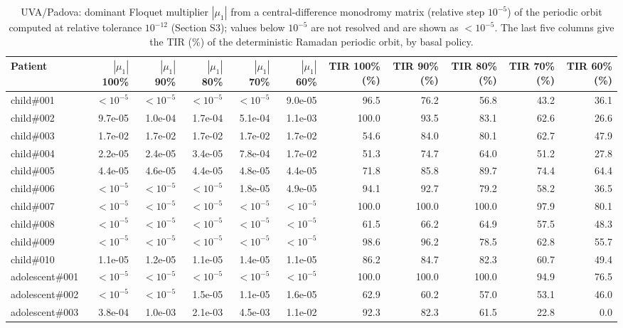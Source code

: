 \begin{table}[H]
\centering
\caption{UVA/Padova: dominant Floquet multiplier $|\mu_1|$ from a central-difference monodromy matrix (relative step $10^{-5}$) of the periodic orbit computed at relative tolerance $10^{-12}$ (Section S3); values below $10^{-5}$ are not resolved and are shown as $<10^{-5}$. The last five columns give the TIR (\%) of the deterministic Ramadan periodic orbit, by basal policy.}\label{tab:S3b}
\scriptsize
\begin{tabular}{lrrrrrrrrrr}
\toprule
Patient & $|\mu_1|$ 100\% & $|\mu_1|$ 90\% & $|\mu_1|$ 80\% & $|\mu_1|$ 70\% & $|\mu_1|$ 60\% & TIR 100\% (\%) & TIR 90\% (\%) & TIR 80\% (\%) & TIR 70\% (\%) & TIR 60\% (\%) \\
\midrule
child\#001 & $<10^{-5}$ & $<10^{-5}$ & $<10^{-5}$ & $<10^{-5}$ & 9.0e-05 & 96.5 & 76.2 & 56.8 & 43.2 & 36.1 \\
child\#002 & 9.7e-05 & 1.0e-04 & 1.7e-04 & 5.1e-04 & 1.1e-03 & 100.0 & 93.5 & 83.1 & 62.6 & 26.6 \\
child\#003 & 1.7e-02 & 1.7e-02 & 1.7e-02 & 1.7e-02 & 1.7e-02 & 54.6 & 84.0 & 80.1 & 62.7 & 47.9 \\
child\#004 & 2.2e-05 & 2.4e-05 & 3.4e-05 & 7.8e-04 & 1.7e-02 & 51.3 & 74.7 & 64.0 & 51.2 & 27.8 \\
child\#005 & 4.4e-05 & 4.6e-05 & 4.4e-05 & 4.8e-05 & 4.4e-05 & 71.8 & 85.8 & 89.7 & 74.4 & 64.4 \\
child\#006 & $<10^{-5}$ & $<10^{-5}$ & $<10^{-5}$ & 1.8e-05 & 4.9e-05 & 94.1 & 92.7 & 79.2 & 58.2 & 36.5 \\
child\#007 & $<10^{-5}$ & $<10^{-5}$ & $<10^{-5}$ & $<10^{-5}$ & $<10^{-5}$ & 100.0 & 100.0 & 100.0 & 97.9 & 80.1 \\
child\#008 & $<10^{-5}$ & $<10^{-5}$ & $<10^{-5}$ & $<10^{-5}$ & $<10^{-5}$ & 61.5 & 66.2 & 64.9 & 57.5 & 48.3 \\
child\#009 & $<10^{-5}$ & $<10^{-5}$ & $<10^{-5}$ & $<10^{-5}$ & $<10^{-5}$ & 98.6 & 96.2 & 78.5 & 62.8 & 55.7 \\
child\#010 & 1.1e-05 & 1.2e-05 & 1.1e-05 & 1.4e-05 & 1.1e-05 & 86.2 & 84.7 & 82.3 & 60.7 & 49.4 \\
adolescent\#001 & $<10^{-5}$ & $<10^{-5}$ & $<10^{-5}$ & $<10^{-5}$ & $<10^{-5}$ & 100.0 & 100.0 & 100.0 & 94.9 & 76.5 \\
adolescent\#002 & $<10^{-5}$ & $<10^{-5}$ & 1.5e-05 & 1.1e-05 & 1.6e-05 & 62.9 & 60.2 & 57.0 & 53.1 & 46.0 \\
adolescent\#003 & 3.8e-04 & 1.0e-03 & 2.1e-03 & 4.5e-03 & 1.1e-02 & 92.3 & 82.3 & 61.5 & 22.8 & 0.0 \\

\end{tabular}
\end{table}
